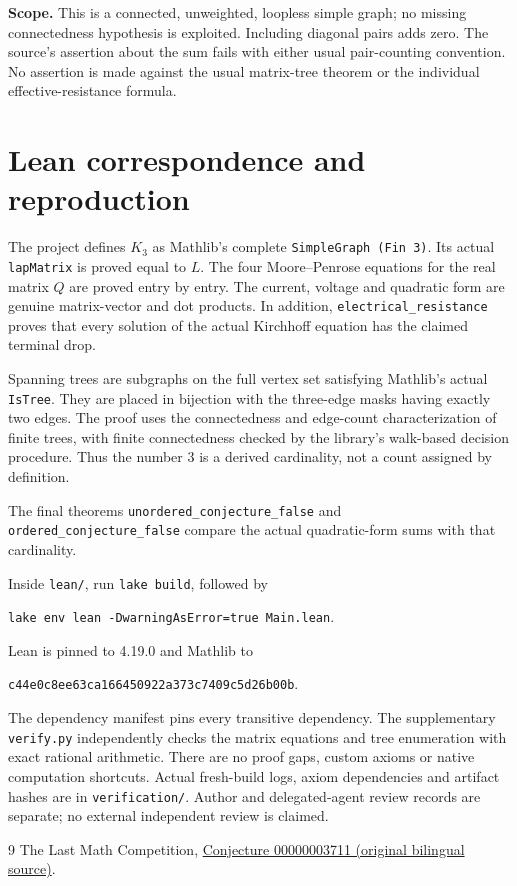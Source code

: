 \documentclass[11pt]{article}
\begin{document}
\noindent\textbf{Scope.} This is a connected, unweighted, loopless simple graph; no missing connectedness hypothesis is exploited. Including diagonal pairs adds zero. The source's assertion about the sum fails with either usual pair-counting convention. No assertion is made against the usual matrix-tree theorem or the individual effective-resistance formula.

\section*{Lean correspondence and reproduction}
The project defines $K_3$ as Mathlib's complete \texttt{SimpleGraph (Fin 3)}. Its actual \texttt{lapMatrix} is proved equal to $L$. The four Moore--Penrose equations for the real matrix $Q$ are proved entry by entry. The current, voltage and quadratic form are genuine matrix-vector and dot products. In addition, \texttt{electrical\_resistance} proves that every solution of the actual Kirchhoff equation has the claimed terminal drop.

Spanning trees are subgraphs on the full vertex set satisfying Mathlib's actual \texttt{IsTree}. They are placed in bijection with the three-edge masks having exactly two edges. The proof uses the connectedness and edge-count characterization of finite trees, with finite connectedness checked by the library's walk-based decision procedure. Thus the number $3$ is a derived cardinality, not a count assigned by definition.

The final theorems \texttt{unordered\_conjecture\_false} and \texttt{ordered\_conjecture\_false} compare the actual quadratic-form sums with that cardinality.

Inside \texttt{lean/}, run \texttt{lake build}, followed by
\begin{center}\texttt{lake env lean -DwarningAsError=true Main.lean}.\end{center}
Lean is pinned to 4.19.0 and Mathlib to
\begin{center}\small\texttt{c44e0c8ee63ca166450922a373c7409c5d26b00b}.\end{center}
The dependency manifest pins every transitive dependency. The supplementary \texttt{verify.py} independently checks the matrix equations and tree enumeration with exact rational arithmetic. There are no proof gaps, custom axioms or native computation shortcuts. Actual fresh-build logs, axiom dependencies and artifact hashes are in \texttt{verification/}. Author and delegated-agent review records are separate; no external independent review is claimed.

\begin{thebibliography}{9}
 The Last Math Competition,
\href{https://github.com/The-Last-Math-Competition/The-Last-Math-Competition/blob/main/conjectures/00000003711.md}{Conjecture 00000003711 (original bilingual source)}.
\end{thebibliography}
\end{document}
